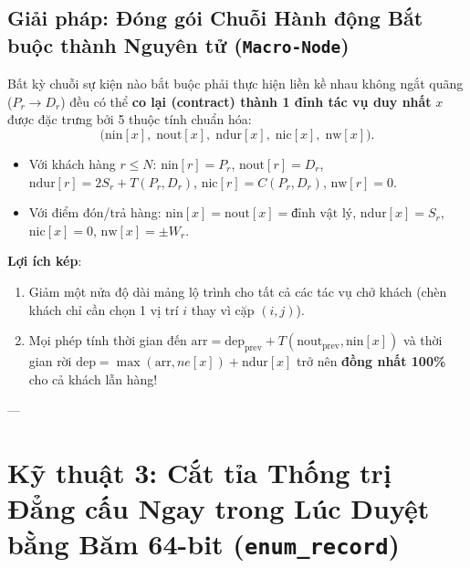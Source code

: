 \documentclass[11pt,a4paper]{article}
\begin{document}
\subsection{Giải pháp: Đóng gói Chuỗi Hành động Bắt buộc thành Nguyên tử (\texttt{Macro-Node})}
Bất kỳ chuỗi sự kiện nào bắt buộc phải thực hiện liền kề nhau không ngắt quãng ($P_r \to D_r$) đều có thể \textbf{co lại (contract) thành 1 đỉnh tác vụ duy nhất} $x$ được đặc trưng bởi 5 thuộc tính chuẩn hóa:
\[
    \big(\text{nin}[x], \; \text{nout}[x], \; \text{ndur}[x], \; \text{nic}[x], \; \text{nw}[x]\big).
\]
\begin{itemize}[leftmargin=1.5em]
    \item Với khách hàng $r \le N$: $\text{nin}[r] = P_r$, $\text{nout}[r] = D_r$, $\text{ndur}[r] = 2S_r + T(P_r, D_r)$, $\text{nic}[r] = C(P_r, D_r)$, $\text{nw}[r] = 0$.
    \item Với điểm đón/trả hàng: $\text{nin}[x] = \text{nout}[x] = \text{đỉnh vật lý}$, $\text{ndur}[x] = S_r$, $\text{nic}[x] = 0$, $\text{nw}[x] = \pm W_r$.
\end{itemize}
\textbf{Lợi ích kép}:
\begin{enumerate}[leftmargin=1.5em]
    \item Giảm một nửa độ dài mảng lộ trình cho tất cả các tác vụ chở khách (chèn khách chỉ cần chọn 1 vị trí $i$ thay vì cặp $(i, j)$).
    \item Mọi phép tính thời gian đến $\text{arr} = \text{dep}_{\text{prev}} + T(\text{nout}_{\text{prev}}, \text{nin}[x])$ và thời gian rời $\text{dep} = \max(\text{arr}, ne[x]) + \text{ndur}[x]$ trở nên \textbf{đồng nhất 100\%} cho cả khách lẫn hàng!
\end{enumerate}

---

\section{Kỹ thuật 3: Cắt tỉa Thống trị Đẳng cấu Ngay trong Lúc Duyệt bằng Băm 64-bit (\texttt{enum\_record})}
\end{document}
